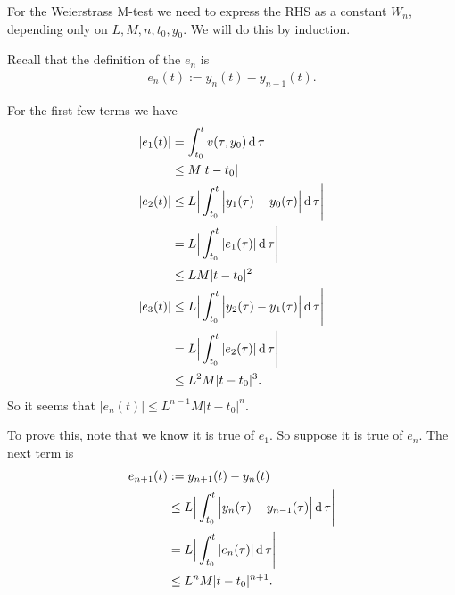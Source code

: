 For the Weierstrass M-test we need to express the RHS as a constant $W_n$,
depending only on $L, M, n, t_0, y_0$. We will do this by induction.

Recall that the definition of the $e_n$ is
\begin{align*}
  e_n(t) := y_n(t) - y_{n-1}(t).
\end{align*}

\newpage
For the first few terms we have
\begin{align*}
  |e_1(t)| &    = \int_{t_0}^t v(\tau, y_0) \operatorname{\text{d}}\tau\\
           & \leq M|t - t_0|\\
  |e_2(t)| & \leq L\Big|\int_{t_0}^t \Big|y_1(\tau) - y_0(\tau)\Big| \operatorname{\text{d}}\tau \Bigg|\\
           &    = L\Big|\int_{t_0}^t |e_1(\tau)| \operatorname{\text{d}}\tau \Bigg|\\
           & \leq LM|t - t_0|^2\\
  |e_3(t)| & \leq L\Big|\int_{t_0}^t \Big|y_2(\tau) - y_1(\tau)\Big| \operatorname{\text{d}}\tau \Bigg|\\
           &    = L\Big|\int_{t_0}^t |e_2(\tau)| \operatorname{\text{d}}\tau \Bigg|\\
                            & \leq L^2M|t - t_0|^3.
\end{align*}
So it seems that $|e_n(t)| \leq L^{n-1}M|t - t_0|^n$.

To prove this, note that we know it is true of $e_1$. So suppose it is true of
$e_n$. The next term is
\begin{align*}
  e_{n+1}(t) &   :=   y_{n+1}(t) - y_n(t)\\
            & \leq L\Big|\int_{t_0}^t \Big|y_n(\tau) - y_{n-1}(\tau)\Big| \operatorname{\text{d}}\tau \Bigg|\\
            &= L\Big|\int_{t_0}^t |e_n(\tau)| \operatorname{\text{d}}\tau \Bigg|\\
            & \leq L^nM|t - t_0|^{n+1}.
\end{align*}

\newpage
{}


